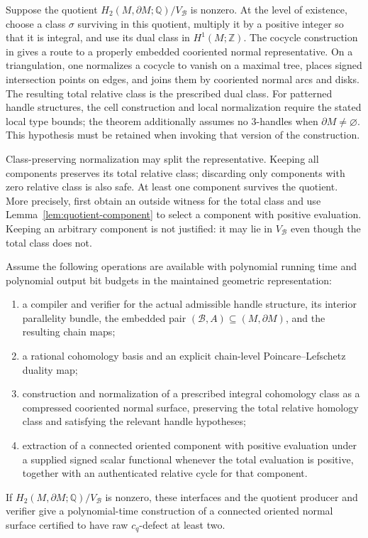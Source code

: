 Suppose the quotient
$H_2(M,\partial M;\mathbb Q)/V_{\mathcal B}$ is nonzero.
At the level of existence, choose a class $\sigma$ surviving in
this quotient, multiply it by a positive integer so that it is
integral, and use its dual class in $H^1(M;\mathbb Z)$.
The cocycle construction in
\cite[Theorem~6.2 and its proof]{lackenby2026} gives a route to a
properly embedded cooriented normal representative. On a
triangulation, one normalizes a cocycle to vanish on a maximal
tree, places signed intersection points on edges, and joins
them by cooriented normal arcs and disks. The resulting total
relative class is the prescribed dual class.
For patterned handle structures, the cell construction and
local normalization require the stated local type bounds;
the theorem additionally assumes no $3$-handles when
$\partial M\neq\varnothing$. This hypothesis must be retained
when invoking that version of the construction.

Class-preserving normalization may split the representative.
Keeping all components preserves its total relative class;
discarding only components with zero relative class is also
safe. At least one component survives the quotient. More
precisely, first obtain an outside witness for the total class
and use Lemma~\ref{lem:quotient-component} to select a component
with positive evaluation. Keeping an arbitrary component is
not justified: it may lie in $V_{\mathcal B}$ even though the
total class does not.

\begin{proposition}
\label{prop:quotient-interface}
Assume the following operations are available with polynomial
running time and polynomial output bit budgets in the maintained
geometric representation:
\begin{enumerate}
 \item a compiler and verifier for the actual admissible
 handle structure, its interior parallelity bundle, the
 embedded pair $(\mathcal B,A)\subseteq(M,\partial M)$,
 and the resulting chain maps;
 \item a rational cohomology basis and an explicit
 chain-level Poincare--Lefschetz duality map;
 \item construction and normalization of a prescribed
 integral cohomology class as a compressed cooriented normal
 surface, preserving the total relative homology class
 and satisfying the relevant handle hypotheses;
 \item extraction of a connected oriented component with
 positive evaluation under a supplied signed scalar
 functional whenever the total evaluation is positive,
 together with an authenticated relative cycle for that
 component.
\end{enumerate}
If $H_2(M,\partial M;\mathbb Q)/V_{\mathcal B}$ is nonzero,
these interfaces and the quotient producer and verifier give
a polynomial-time construction of a connected oriented normal
surface certified to have raw $c_q$-defect at least two.
\end{proposition}


